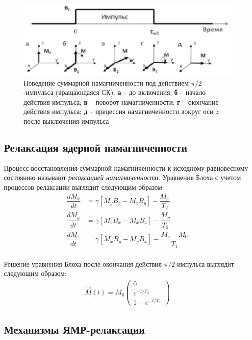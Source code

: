 \begin{figure}[h]
	\centering
	\includegraphics[width=0.7\linewidth]{M-rotation}
	\caption{Поведение суммарной намагниченности под действием $\pi /2$-импульса (вращающаяся СК). \textbf{а} -- до включения; \textbf{б} -- начало действия импульса; \textbf{в} -- поворот намагниченности; \textbf{г} --  окончание действия импульса; \textbf{д} -- прецессия намагниченности вокруг оси $z$ после выключения импульса}
	\label{fig:m-rotation}
\end{figure}


\subsection{Релаксация ядерной намагниченности}
Процесс восстановления суммарной намагниченности к исходному равновесному состоянию называют \textit{релаксацией намагниченности}. Уравнение Блоха с учетом процессов релаксации выглядит следующим образом
\begin{align}
\label{Bloh-relaxaion}
\dfrac{d M_x}{dt} &= \gamma \left[ M_y B_z - M_z B_y\right] - \dfrac{M_x}{T_2} \\
\dfrac{d M_y}{dt} &= \gamma \left[ M_z B_x - M_x B_z\right] - \dfrac{M_y}{T_2} \\
\dfrac{d M_z}{dt} &= \gamma \left[ M_x B_y - M_y B_x\right] - \dfrac{M_z - M_0}{T_1} \\
\end{align}

Решение уравнения Блоха после окончания действия $\pi /2$-импульса выглядит следующим образом:
\begin{align}
	\vec{M}(t) = M_0
	\begin{pmatrix}
		0 \\
		e^{-t/T_2} \\
		1 - e^{-t/T_1}
	\end{pmatrix}
\end{align}

\subsection{Механизмы ЯМР-релаксации}